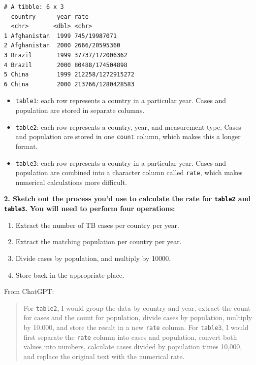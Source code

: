 \documentclass[
  letterpaper,
  DIV=11,
  numbers=noendperiod]{scrreprt}
\providecommand{\tightlist}{%
  \setlength{\itemsep}{0pt}\setlength{\parskip}{0pt}}
\begin{document}
\begin{verbatim}
# A tibble: 6 x 3
  country      year rate             
  <chr>       <dbl> <chr>            
1 Afghanistan  1999 745/19987071     
2 Afghanistan  2000 2666/20595360    
3 Brazil       1999 37737/172006362  
4 Brazil       2000 80488/174504898  
5 China        1999 212258/1272915272
6 China        2000 213766/1280428583
\end{verbatim}

\begin{itemize}
\tightlist
\item
  \texttt{table1}: each row represents a country in a particular year.
  Cases and population are stored in separate columns.
\item
  \texttt{table2}: each row represents a country, year, and measurement
  type. Cases and population are stored in one \texttt{count} column,
  which makes this a longer format.
\item
  \texttt{table3}: each row represents a country in a particular year.
  Cases and population are combined into a character column called
  \texttt{rate}, which makes numerical calculations more difficult.
\end{itemize}

\textbf{2. Sketch out the process you'd use to calculate the rate for
\texttt{table2} and \texttt{table3}. You will need to perform four
operations:}

\begin{enumerate}
\def\labelenumi{\alph{enumi}.}
\tightlist
\item
  Extract the number of TB cases per country per year.
\item
  Extract the matching population per country per year.
\item
  Divide cases by population, and multiply by 10000.
\item
  Store back in the appropriate place.
\end{enumerate}

From ChatGPT:

\begin{quote}
For \texttt{table2}, I would group the data by country and year, extract
the count for cases and the count for population, divide cases by
population, multiply by 10,000, and store the result in a new
\texttt{rate} column. For \texttt{table3}, I would first separate the
\texttt{rate} column into cases and population, convert both values into
numbers, calculate cases divided by population times 10,000, and replace
the original text with the numerical rate.
\end{quote}
\end{document}
